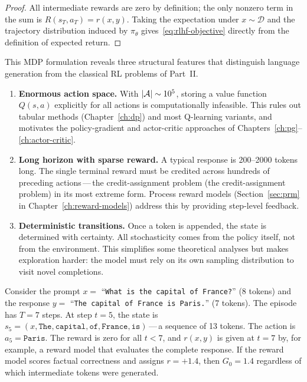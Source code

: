 \begin{proof}
All intermediate rewards are zero by definition; the only nonzero term in the sum is $R(s_T, a_T) = r(x, y)$. Taking the expectation under $x \sim \mathcal{D}$ and the trajectory distribution induced by $\pi_\theta$ gives~\eqref{eq:rlhf-objective} directly from the definition of expected return.
\end{proof}

This MDP formulation reveals three structural features that distinguish language generation from the classical RL problems of Part~II.

\begin{remark}
\label{rem:lm-mdp-features}
\begin{enumerate}[leftmargin=*]
  \item \textbf{Enormous action space.} With $|\mathcal{A}| \sim 10^5$, storing a value function $Q(s, a)$ explicitly for all actions is computationally infeasible. This rules out tabular methods (Chapter~\ref{ch:dp}) and most Q-learning variants, and motivates the policy-gradient and actor-critic approaches of Chapters~\ref{ch:pg}--\ref{ch:actor-critic}.
  \item \textbf{Long horizon with sparse reward.} A typical response is 200--2000 tokens long. The single terminal reward must be credited across hundreds of preceding actions\,---\,the credit-assignment problem (the credit-assignment problem) in its most extreme form. Process reward models (Section~\ref{sec:prm} in Chapter~\ref{ch:reward-models}) address this by providing step-level feedback.
  \item \textbf{Deterministic transitions.} Once a token is appended, the state is determined with certainty. All stochasticity comes from the policy itself, not from the environment. This simplifies some theoretical analyses but makes exploration harder: the model must rely on its own sampling distribution to visit novel completions.
\end{enumerate}
\end{remark}

\begin{example}
\label{ex:token-mdp-example}
Consider the prompt $x = $ ``\texttt{What is the capital of France?}'' (8 tokens) and the response $y = $ ``\texttt{The capital of France is Paris.}'' (7 tokens). The episode has $T = 7$ steps. At step $t = 5$, the state is $s_5 = (x, \texttt{The}, \texttt{capital}, \texttt{of}, \texttt{France}, \texttt{is})$\,---\,a sequence of 13 tokens. The action is $a_5 = \texttt{Paris}$. The reward is zero for all $t < 7$, and $r(x, y)$ is given at $t = 7$ by, for example, a reward model that evaluates the complete response. If the reward model scores factual correctness and assigns $r = +1.4$, then $G_0 = 1.4$ regardless of which intermediate tokens were generated.
\end{example}

